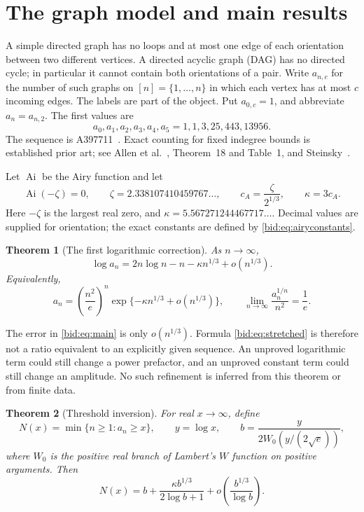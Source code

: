 \documentclass[11pt,letterpaper]{article}
\numberwithin{equation}{section}
\newtheorem{theorem}{Theorem}[section]
\theoremstyle{remark}\newtheorem{remark}[theorem]{Remark}
\DeclareMathOperator{\Ai}{Ai}
\begin{document}
\section{The graph model and main results}\label{bid:sec:main}
A simple directed graph has no loops and at most one edge of each
orientation between two different vertices. A directed acyclic graph
(DAG) has no directed cycle; in particular it cannot contain both
orientations of a pair. Write $a_{n,c}$ for the number of such graphs on
$[n]=\{1,\ldots,n\}$ in which each vertex has at most $c$ incoming edges.
The labels are part of the object. Put $a_{0,c}=1$, and abbreviate
$a_n=a_{n,2}$. The first values are
\[
 a_0,a_1,a_2,a_3,a_4,a_5=1,1,3,25,443,13956.
\]
The sequence is A397711~\cite{oeis}. Exact counting for
fixed indegree bounds is established prior art; see Allen et
al.~\cite{allen}, Theorem~18 and Table~1, and Steinsky~\cite{steinsky}.

Let $\Ai$ be the Airy function and let
\begin{equation}\label{bid:eq:airyconstants}
 \Ai(-\zeta)=0,\qquad
 \zeta=2.338107410459767\ldots,
 \qquad c_A=\frac\zeta{2^{1/3}},\qquad \kappa=3c_A.
\end{equation}
Here $-\zeta$ is the largest real zero, and
$\kappa=5.567271244467717\ldots$. Decimal values are supplied for
orientation; the exact constants are defined by \eqref{bid:eq:airyconstants}.

\begin{theorem}[The first logarithmic correction]\label{bid:thm:main}
As $n\to\infty$,
\begin{equation}\label{bid:eq:main}
 \log a_n=2n\log n-n-\kappa n^{1/3}+o(n^{1/3}).
\end{equation}
Equivalently,
\begin{equation}\label{bid:eq:stretched}
 a_n=\left(\frac{n^2}{e}\right)^n
       \exp\{-\kappa n^{1/3}+o(n^{1/3})\},
 \qquad \lim_{n\to\infty}\frac{a_n^{1/n}}{n^2}=\frac1e.
\end{equation}
\end{theorem}

The error in \eqref{bid:eq:main} is only $o(n^{1/3})$. Formula
\eqref{bid:eq:stretched} is therefore not a ratio equivalent to an explicitly
given sequence. An unproved logarithmic term could still change a power
prefactor, and an unproved constant term could still change an amplitude.
No such refinement is inferred from this theorem or from finite data.

\begin{theorem}[Threshold inversion]\label{bid:thm:inverse}
For real $x\to\infty$, define
\begin{equation}\label{bid:eq:inverseparameters}
 N(x)=\min\{n\geq1:a_n\geq x\},\qquad
 y=\log x,\qquad
 b=\frac{y}{2W_0(y/(2\sqrt e))},
\end{equation}
where $W_0$ is the positive real branch of Lambert's $W$ function on
positive arguments. Then
\begin{equation}\label{bid:eq:inverse}
 N(x)=b+\frac{\kappa b^{1/3}}{2\log b+1}
           +o\!\left(\frac{b^{1/3}}{\log b}\right).
\end{equation}
\end{theorem}
\end{document}
